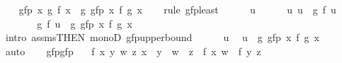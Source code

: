 \begin{isabellebody}
\ \ \isamarkupfalse%
\ {\isachardoublequoteopen}gfp\ {\isacharparenleft}{\kern0pt}{\isasymlambda}x{\isachardot}{\kern0pt}\ g\ {\isacharparenleft}{\kern0pt}f\ x{\isacharparenright}{\kern0pt}{\isacharparenright}{\kern0pt}\ {\isasymle}\ g\ {\isacharparenleft}{\kern0pt}gfp\ {\isacharparenleft}{\kern0pt}{\isasymlambda}x{\isachardot}{\kern0pt}\ f\ {\isacharparenleft}{\kern0pt}g\ x{\isacharparenright}{\kern0pt}{\isacharparenright}{\kern0pt}{\isacharparenright}{\kern0pt}{\isachardoublequoteclose}\isanewline
\ \ \isamarkupfalse%
\ {\isacharparenleft}{\kern0pt}rule\ gfp{\isacharunderscore}{\kern0pt}least{\isacharparenright}{\kern0pt}\isanewline
\ \ \ \ \isamarkupfalse%
\ u\isanewline
\ \ \ \ \isamarkupfalse%
\ u{\isacharcolon}{\kern0pt}\ {\isachardoublequoteopen}u\ {\isasymle}\ g\ {\isacharparenleft}{\kern0pt}f\ u{\isacharparenright}{\kern0pt}{\isachardoublequoteclose}\isanewline
\ \ \ \ \isamarkupfalse%
\ \isamarkupfalse%
\ {\isachardoublequoteopen}g\ {\isacharparenleft}{\kern0pt}f\ u{\isacharparenright}{\kern0pt}\ {\isasymle}\ g\ {\isacharparenleft}{\kern0pt}gfp\ {\isacharparenleft}{\kern0pt}{\isasymlambda}x{\isachardot}{\kern0pt}\ f\ {\isacharparenleft}{\kern0pt}g\ x{\isacharparenright}{\kern0pt}{\isacharparenright}{\kern0pt}{\isacharparenright}{\kern0pt}{\isachardoublequoteclose}\isanewline
\ \ \ \ \ \ \isamarkupfalse%
\ {\isacharparenleft}{\kern0pt}intro\ assms{\isacharbrackleft}{\kern0pt}THEN\ monoD{\isacharbrackright}{\kern0pt}\ gfp{\isacharunderscore}{\kern0pt}upperbound{\isacharparenright}{\kern0pt}\isanewline
\ \ \ \ \isamarkupfalse%
\ u\ \isamarkupfalse%
\ {\isachardoublequoteopen}u\ {\isasymle}\ g\ {\isacharparenleft}{\kern0pt}gfp\ {\isacharparenleft}{\kern0pt}{\isasymlambda}x{\isachardot}{\kern0pt}\ f\ {\isacharparenleft}{\kern0pt}g\ x{\isacharparenright}{\kern0pt}{\isacharparenright}{\kern0pt}{\isacharparenright}{\kern0pt}{\isachardoublequoteclose}\isanewline
\ \ \ \ \ \ \isamarkupfalse%
\ auto\isanewline
\ \ \isamarkupfalse%
\isanewline
{}\isamarkupfalse%
%
\endisatagproof
{\isafoldproof}%
%
\isadelimproof
\isanewline
%
\endisadelimproof
\isanewline
{}\isamarkupfalse%
\ gfp{\isacharunderscore}{\kern0pt}gfp{\isacharcolon}{\kern0pt}\isanewline
\ \ \ f{\isacharcolon}{\kern0pt}\ {\isachardoublequoteopen}{\isasymAnd}x\ y\ w\ z{\isachardot}{\kern0pt}\ x\ {\isasymle}\ y\ {\isasymLongrightarrow}\ w\ {\isasymle}\ z\ {\isasymLongrightarrow}\ f\ x\ w\ {\isasymle}\ f\ y\ z{\isachardoublequoteclose}\isanewline

\end{isabellebody}
